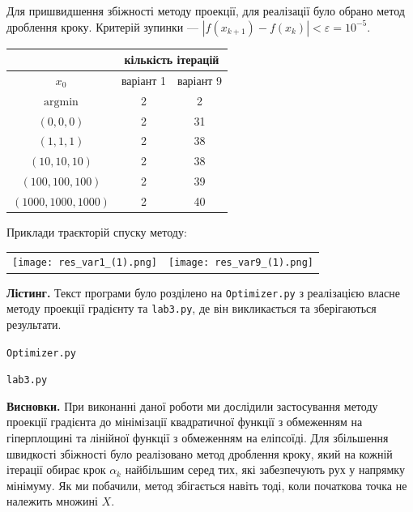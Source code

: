 \documentclass{extreport}
\begin{document}
Для пришвидшення збіжності методу проекції, для реалізації було обрано метод дроблення кроку.
Критерій зупинки --- $\left| f(x_{k+1}) - f(x_k)\right| < \varepsilon = 10^{-5}$.

\begin{center}
    \begin{tabular}{|c|c|c|}
        \hline
        {} & \multicolumn{2}{c|}{кількість ітерацій}\\
        \hline
        $x_0$ & {варіант 1} & {варіант 9}\\
        \hline
        $\mathrm{argmin}$ & 2 & 2 \\
        \hline
        $(0, 0, 0)$ & 2 & 31 \\
        \hline
        $(1, 1, 1)$ & 2 & 38 \\
        \hline
        $(10, 10, 10)$ & 2 & 38 \\
        \hline
        $(100, 100, 100)$ & 2 & 39 \\
        \hline
        $(1000, 1000, 1000)$ & 2 & 40 \\
        \hline
    \end{tabular}
\end{center}

Приклади траєкторій спуску методу:
\begin{center}
    \begin{tabular}{c c}
        \texttt{[image: res\_var1\_(1).png]} &
        \texttt{[image: res\_var9\_(1).png]} 
    \end{tabular}
\end{center}

\noindent\textbf{Лістинг.}
Текст програми було розділено на \texttt{Optimizer.py} з реалізацією
власне методу проекції градієнту та \texttt{lab3.py}, де він викликається та зберігаються результати.

\noindent\texttt{Optimizer.py}


\noindent\texttt{lab3.py}


\noindent\textbf{Висновки.} При виконанні даної роботи ми дослідили
застосування методу проекції градієнта до мінімізації квадратичної функції 
з обмеженням на гіперплощині та лінійної функції з обмеженням на еліпсоїді. Для збільшення швидкості збіжності було реалізовано метод дроблення кроку,
який на кожній ітерації обирає крок $\alpha_k$ найбільшим серед тих, які забезпечують рух
у напрямку мінімуму. Як ми побачили, метод збігається навіть тоді, коли початкова точка не належить множині $X$.
\end{document}
